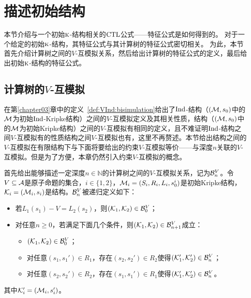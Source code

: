 \section{描述初始结构}\label{chapter06:sec:des}%
本节介绍与一个初始$\textsc{k}$-结构相关的$\textrm{CTL}$公式——特征公式是如何得到的。
对于一个给定的初始$\textsc{k}$-结构，其特征公式与其计算树的特征公式密切相关。
为此，本节首先介绍计算树之间的$V$-互模拟关系，然后给出计算树的特征公式的定义，最后给出初始$\textsc{k}$-结构的特征公式。

\subsection{计算树的$V$-互模拟}
在第\ref{chapter03}章中的定义~\ref{def:VInd:bisimulation}给出了$\textrm{Ind}$-结构（$({\cal M},s_0)$中的${\cal M}$为初始$\textrm{Ind}$-Kripke结构）之间的$V$-互模拟定义及其相关性质，结构（$({\cal M},s_0)$中的${\cal M}$为初始Kripke结构）之间的$V$-互模拟有相同的定义，且不难证明$\textrm{Ind}$-结构之间$V$-互模拟有的性质结构之间$V$-互模拟也有，这里不再赘述。本节给出结构之间的$V$-互模拟在有限结构下与下面将要给出的约束$V$-互模拟等价——与深度$n$关联的$V$-互模拟。但是为了方便，本章仍然引入约束$V$-互模拟的概念。

首先给出能够描述一定深度$n\in \mathbb{N}$的计算树之间的$V$-互模拟关系，记为${\cal B}_n^V$。令$V\subseteq {\cal A}$是原子命题的集合，$i\in \{1,2\}$，${\cal M}_i=(S_i,R_i,L_i,s_0^i)$是初始Kripke结构，${\cal K}_i=({\cal M}_i, s_i)$是结构。${\cal B}_n^V$被递归定义如下：
\begin{itemize}
	\item 若$L_1(s_1)-V=L_2(s_2)$，则$({\cal K}_1,{\cal K}_2) \in {\cal B}_0^V$；
	\item 对任意$n\ge 0$，若满足下面几个条件，则$({\cal K}_1,{\cal K}_2)\in {\cal B}_{n+1}^V$成立：
	\begin{itemize}
		\item $({\cal K}_1,{\cal K}_2) \in {\cal B}_0^V$；
		\item 对任意$(s_1,s_1')\in R_1$，存在$(s_2,s_2')\in R_2$使得$({\cal K}_1',{\cal K}_2') \in {\cal B}_n^V$；
		\item 对任意$(s_2,s_2')\in R_2$，存在$(s_1,s_1')\in R_1$使得$({\cal K}_1',{\cal K}_2') \in {\cal B}_n^V$。
	\end{itemize}
\end{itemize}
其中${\cal K}_i'=({\cal M}_i,s_i')$。

